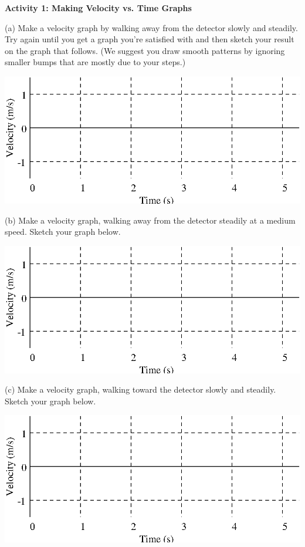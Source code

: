 \textbf{Activity 1: Making Velocity vs. Time Graphs} 

(a) Make a velocity graph by walking away from the detector slowly and steadily.
Try again until you get a graph you're satisfied with and then sketch your result
on the graph that follows. (We suggest you draw smooth patterns by ignoring
smaller bumps that are mostly due to your steps.)

\vspace{0.3cm}
{\par\centering \includegraphics{velocity/velocity_fig1.eps} \par}
\vspace{0.3cm}

(b) Make a velocity graph, walking away from the detector steadily at a medium
speed. Sketch your graph below.

\vspace{0.3cm}
{\par\centering \includegraphics{velocity/velocity_fig1.eps} \par}
\vspace{0.3cm}

(c) Make a velocity graph, walking toward the detector slowly and steadily.
Sketch your graph below.

\vspace{0.3cm}
{\par\centering \includegraphics{velocity/velocity_fig1.eps} \par}
\vspace{0.3cm}


